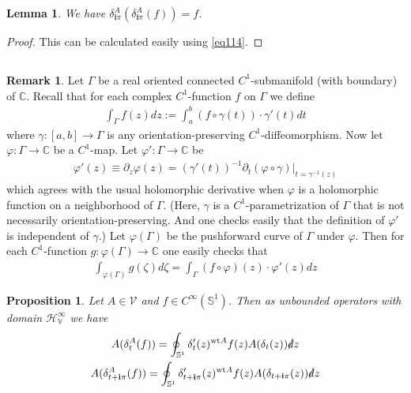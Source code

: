 \documentclass[12pt,b5paper,notitlepage]{article}
\theoremstyle{definition}
\newtheorem{rem}[df]{Remark}
\theoremstyle{plain}
\newtheorem{pp}[df]{Proposition}
\newtheorem{lm}[df]{Lemma}
\newcommand{\mc}{\mathcal}
\newcommand{\im}{\mathbf{i}}
\newcommand{\Cbb}{\mathbb C}
\newcommand{\wt}{\mathrm{wt}}
\newcommand{\Sbb}{{\mathbb S}}
\newcommand{\HV}{\mathcal H_{\mathbb V}}
\newcommand{\ointn}{\oint\nolimits}
\newcommand{\sd}{\slashed{d}}
\numberwithin{equation}{section}
\begin{document}
\begin{lm}\label{lb84}
We have $\delta^A_{\im\pi}(\delta^A_{\im\pi}(f))=f$.
\end{lm}


\begin{proof}
This can be calculated easily using \eqref{eq114}.
\end{proof}





\subsection{}




\begin{rem}\label{lb77}
Let $\Gamma$ be a real oriented connected $C^1$-submanifold (with boundary) of $\Cbb$. Recall that for each complex $C^1$-function $f$ on $\Gamma$ we define
\begin{align*}
\int_\Gamma f(z)dz:=\int_a^b (f\circ\gamma(t))\cdot \gamma'(t)dt
\end{align*}  
where $\gamma:[a,b]\rightarrow\Gamma$ is any orientation-preserving $C^1$-diffeomorphism. Now let $\varphi:\Gamma\rightarrow \Cbb$ be a $C^1$-map. Let $\varphi':\Gamma\rightarrow\Cbb$ be 
\begin{align}
\varphi'(z)\equiv\partial_z\varphi(z)=(\gamma'(t))^{-1}\partial_t(\varphi\circ\gamma)\big|_{t=\gamma^{-1}(z)}
\end{align}
which agrees with the usual holomorphic derivative when $\varphi$ is a holomorphic function on a neighborhood of $\Gamma$. (Here, $\gamma$ is a $C^1$-parametrization of $\Gamma$ that is not necessarily orientation-preserving. And one checks easily that the definition of $\varphi'$ is independent of $\gamma$.) Let $\varphi(\Gamma)$ be the pushforward  curve of $\Gamma$ under $\varphi$. Then for each $C^1$-function $g:\varphi(\Gamma)\rightarrow\Cbb$ one easily checks that 
\begin{align*}
\int_{\varphi(\Gamma)} g(\zeta)d\zeta=\int_\Gamma (f\circ\varphi)(z)\cdot \varphi'(z)dz
\end{align*}
\end{rem}



\begin{pp}\label{lb78}
Let $A\in\mc V$ and $f\in C^\infty(\Sbb^1)$. Then as unbounded operators with domain $\HV^\infty$ we have
\begin{subequations}\label{eq101}
\begin{gather}
A(\delta_t^A(f))=\ointn_{\Sbb^1} \delta'_t(z)^{\wt A}f(z)A(\delta_t(z))\sd z\label{eq101a}\\
A(\delta^A_{t+\im\pi}(f))=\ointn_{\Sbb^1} \delta'_{t+\im\pi}(z)^{\wt A}f(z)A(\delta_{t+\im\pi}(z))\sd z\label{eq101b}
\end{gather}
\end{subequations}
\end{pp}
\end{document}

